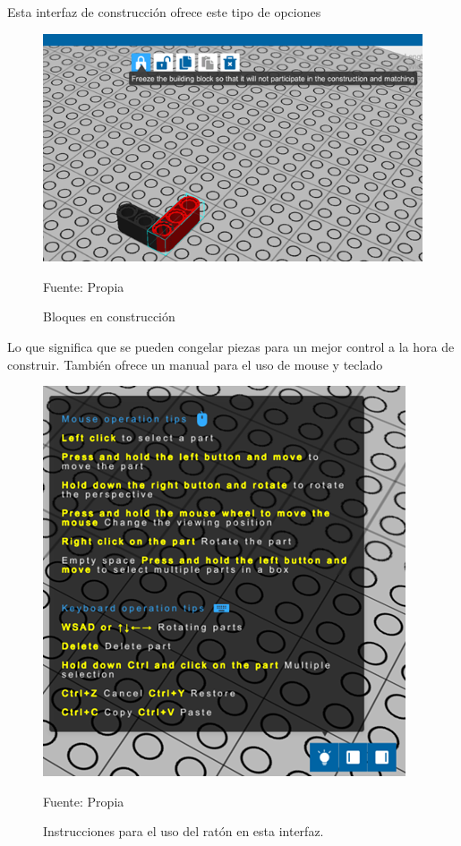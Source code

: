 Esta interfaz de construcción ofrece este tipo de opciones

\begin{figure}[H]
    \centering
    \includegraphics[scale = 0.90]{Imagenes/bloques_constr.png}
    \caption{Bloques en construcción}{Fuente: Propia}
\end{figure}

Lo que significa que se pueden congelar piezas para un mejor control a la hora de construir.
También ofrece un manual para el uso de mouse y teclado

\begin{figure}[H]
    \centering
    \includegraphics[scale = 0.90]{Imagenes/instruccionesRaton.png}
    \caption{Instrucciones para el uso del ratón en esta interfaz.}{Fuente: Propia}
\end{figure}

